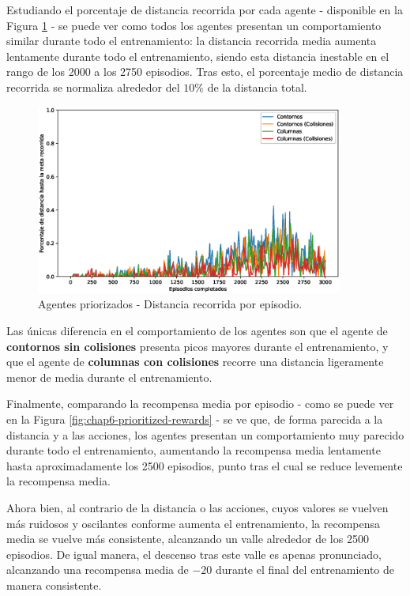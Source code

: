 Estudiando el porcentaje de distancia recorrida por cada agente - disponible en la Figura \ref{fig:chap6-prioritized-distances} - se puede ver como todos los agentes presentan un comportamiento similar durante todo el entrenamiento: la distancia recorrida media aumenta lentamente durante todo el entrenamiento, siendo esta distancia inestable en el rango de los 2000 a los 2750 episodios. Tras esto, el porcentaje medio de distancia recorrida se normaliza alrededor del $10\%$ de la distancia total.

\begin{figure}[H]
    \centering
    \includegraphics[width=0.9\textwidth]{imagenes/cap6/prioritized/smoothed_distances.eps}
    \caption{Agentes priorizados - Distancia recorrida por episodio.}
    \label{fig:chap6-prioritized-distances}
\end{figure}

Las únicas diferencia en el comportamiento de los agentes son que el agente de \textbf{contornos sin colisiones} presenta picos mayores durante el entrenamiento, y que el agente de \textbf{columnas con colisiones} recorre una distancia ligeramente menor de media durante el entrenamiento.

Finalmente, comparando la recompensa media por episodio - como se puede ver en la Figura \ref{fig:chap6-prioritized-rewards} - se ve que, de forma parecida a la distancia y a las acciones, los agentes presentan un comportamiento muy parecido durante todo el entrenamiento, aumentando la recompensa media lentamente hasta aproximadamente los 2500 episodios, punto tras el cual se reduce levemente la recompensa media.

Ahora bien, al contrario de la distancia o las acciones, cuyos valores se vuelven más ruidosos y oscilantes conforme aumenta el entrenamiento, la recompensa media se vuelve más consistente, alcanzando un valle alrededor de los 2500 episodios. De igual manera, el descenso tras este valle es apenas pronunciado, alcanzando una recompensa media de $-20$ durante el final del entrenamiento de manera consistente.

